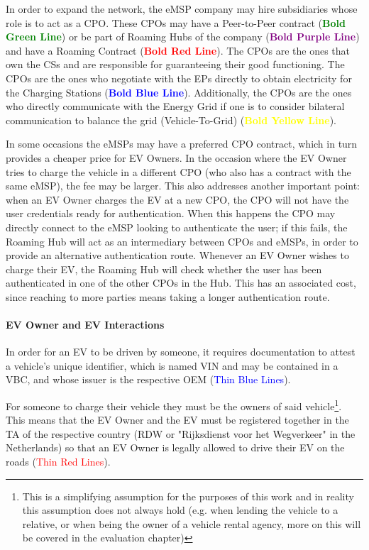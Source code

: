 In order to expand the network, the eMSP company may hire subsidiaries whose role is to act as a \acrfull{CPO}. These CPOs may have a Peer-to-Peer contract (\textcolor{green}{\textbf{Bold Green Line}}) or be part of Roaming Hubs of the company (\textcolor{purple}{\textbf{Bold Purple Line}}) and have a Roaming Contract (\textcolor{red}{\textbf{Bold Red Line}}). The CPOs are the ones that own the \glspl{CS} and are responsible for guaranteeing their good functioning. 
The CPOs are the ones who negotiate with the \glspl{EP} directly to obtain electricity for the Charging Stations (\textcolor{blue}{\textbf{Bold Blue Line}}). Additionally, the CPOs are the ones who directly communicate with the Energy Grid if one is to consider bilateral communication to balance the grid (Vehicle-To-Grid) (\textcolor{yellow}{\textbf{Bold Yellow Line}}).

In some occasions the eMSPs may have a preferred CPO contract, which in turn provides a cheaper price for EV Owners. In the occasion where the EV Owner tries to charge the vehicle in a different CPO (who also has a contract with the same eMSP), the fee may be larger. This also addresses another important point: when an EV Owner charges the EV at a new CPO, the CPO will not have the user credentials ready for authentication. When this happens the CPO may directly connect to the eMSP looking to authenticate the user; if this fails, the Roaming Hub will act as an intermediary between CPOs and eMSPs, in order to provide an alternative authentication route. Whenever an EV Owner wishes to charge their EV, the Roaming Hub will check whether the user has been authenticated in one of the other CPOs in the Hub. This has an associated cost, since reaching to more parties means taking a longer authentication route.

\paragraph{EV Owner and EV Interactions}

In order for an EV to be driven by someone, it requires documentation to attest a vehicle's unique identifier, which is named \acrfull{VIN} and may be contained in a \acrfull{VBC}, and whose issuer is the respective \acrfull{OEM} (\textcolor{blue}{Thin Blue Lines}).

For someone to charge their vehicle they must be the owners of said vehicle\footnote{This is a simplifying assumption for the purposes of this work and in reality this assumption does not always hold (e.g. when lending the vehicle to a relative, or when being the owner of a vehicle rental agency, more on this will be covered in the evaluation chapter)}. This means that the EV Owner and the EV must be registered together in the \acrfull{TA} of the respective country (RDW or "Rijksdienst voor het Wegverkeer" in the Netherlands) so that an EV Owner is legally allowed to drive their EV on the roads (\textcolor{red}{Thin Red Lines}).

